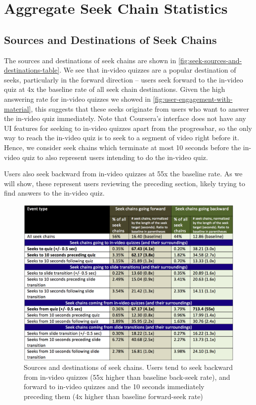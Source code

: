 \documentclass{sigchi}
\begin{document}
\section{Aggregate Seek Chain Statistics}

\subsection{Sources and Destinations of Seek Chains}

The sources and destinations of seek chains are shown in \autoref{fig:seek-sources-and-destinations-table}. We see that in-video quizzes are a popular destination of seeks, particularly in the forward direction -- users seek forward to the in-video quiz at 4x the baseline rate of all seek chain destinations. Given the high answering rate for in-video quizzes we showed in \autoref{fig:user-engagement-with-material}, this suggests that these seeks originate from users who want to answer the in-video quiz immediately. Note that Coursera's interface does not have any UI features for seeking to in-video quizzes apart from the progressbar, so the only way to reach the in-video quiz is to seek to a segment of video right before it. Hence, we consider seek chains which terminate at most 10 seconds before the in-video quiz to also represent users intending to do the in-video quiz.

Users also seek backward from in-video quizzes at 55x the baseline rate. As we will show, these represent users reviewing the preceding section, likely trying to find answers to the in-video quiz.

\begin{figure}
\includegraphics[width=1.0\columnwidth]{seek-sources-and-destinations-table}
\caption{Sources and destinations of seek chains. Users tend to seek backward from in-video quizzes (55x higher than baseline back-seek rate), and forward to in-video quizzes and the 10 seconds immediately preceding them (4x higher than baseline forward-seek rate)}
\label{fig:seek-sources-and-destinations-table}
\end{figure}
\end{document}
